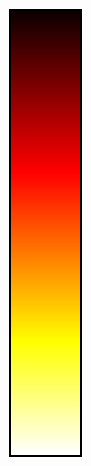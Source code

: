 \documentclass[5p]{elsarticle}
\begin{document}
\begin{figure}
\begin{minipage}{.033\linewidth}
    \includegraphics[width=\linewidth]{correlation_cmap.pdf}%

\end{minipage}
\end{figure}
\end{document}
